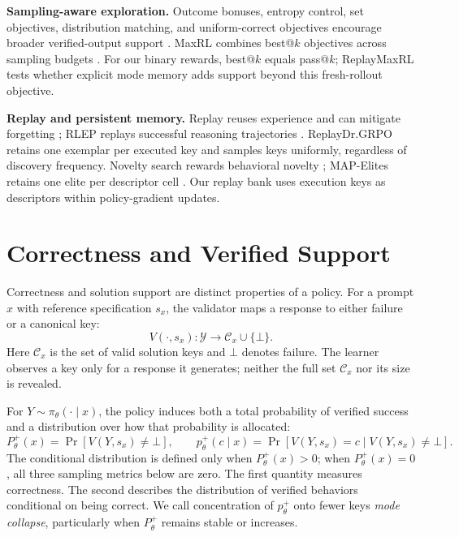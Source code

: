 \documentclass{article}
\newcommand{\1}{\mathbf 1}
\theoremstyle{remark}
\theoremstyle{definition}
\theoremstyle{plain}
\begin{document}
\noindent\textbf{Sampling-aware exploration.}
Outcome bonuses, entropy control, set objectives, distribution matching, and
uniform-correct objectives encourage broader verified-output support
\citep{song2025outcome,chen2025passktraining,li2025divergence,
li2026setpo,li2026distribution,lochab2026ucpo}. MaxRL combines
best@\(k\) objectives across sampling budgets \citep{tajwar2026maxrl}.
For our binary rewards, best@\(k\) equals pass@\(k\); ReplayMaxRL tests
whether explicit mode memory adds support beyond this fresh-rollout objective.

\noindent\textbf{Replay and persistent memory.}
Replay reuses experience and can mitigate forgetting
\citep{lin1992selfimproving,rolnick2019replay}; RLEP replays successful reasoning
trajectories \citep{zhang2025rlep}. ReplayDr.GRPO retains one exemplar per executed
key and samples keys uniformly, regardless of discovery frequency.
Novelty search rewards behavioral novelty \citep{lehman2011novelty}; MAP-Elites
retains one elite per descriptor cell \citep{mouret2015illuminating}.
Our replay bank uses execution keys as descriptors within policy-gradient updates.

\section{Correctness and Verified Support}
\label{sec:collapse}

Correctness and solution support are distinct properties of a policy. For a
prompt $x$ with reference specification $s_x$, the validator maps a response
to either failure or a canonical key:
\[
  V(\cdot,s_x):\mathcal Y\rightarrow \mathcal C_x\cup\{\bot\}.
\]
Here $\mathcal C_x$ is the set of valid solution keys and $\bot$ denotes
failure. The learner observes a key only for a response it generates; neither
the full set $\mathcal C_x$ nor its size is revealed.

For $Y\sim\pi_\theta(\cdot\mid x)$, the policy induces both a total probability
of verified success and a distribution over how that probability is allocated:
\[
 P_\theta^+(x)=\Pr[V(Y,s_x)\neq\bot],
 \qquad
 p_\theta^+(c\mid x)=\Pr[V(Y,s_x)=c\mid V(Y,s_x)\neq\bot].
\]
The conditional distribution is defined only when $P_\theta^+(x)>0$;
when $P_\theta^+(x)=0$, all three sampling metrics below are zero.
The first quantity measures correctness. The second describes the distribution
of verified behaviors conditional on being correct. We call concentration of
$p_\theta^+$ onto fewer keys \emph{mode collapse}, particularly when
$P_\theta^+$ remains stable or increases.
\end{document}
